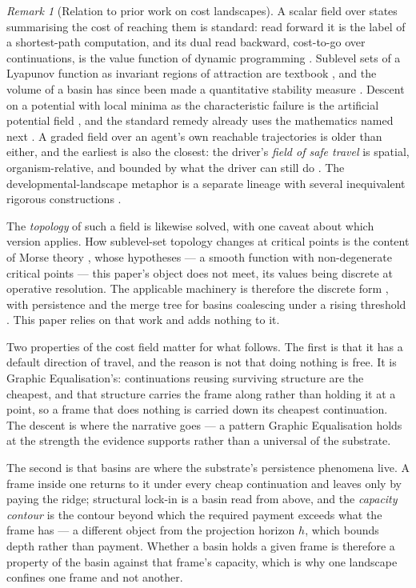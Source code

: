 \documentclass[11pt,a4paper]{article}
\theoremstyle{remark}
\newtheorem{remark}[definition]{Remark}
\begin{document}
\begin{remark}[Relation to prior work on cost landscapes]\label{rem:contours-prior}
A scalar field over states summarising the cost of reaching them is standard: read forward it is the
label of a shortest-path computation, and its dual read backward, cost-to-go over continuations, is
the value function of dynamic programming \citep{bellman1957}. Sublevel sets of a Lyapunov function
as invariant regions of attraction are textbook \citep{genesio1985}, and the volume of a basin has
since been made a quantitative stability measure \citep{menck2013}. Descent on a potential with local
minima as the characteristic failure is the artificial potential field \citep{khatib1986}, and the
standard remedy already uses the mathematics named next \citep{rimon1992}. A graded field over an
agent's own reachable trajectories is older than either, and the earliest is also the closest: the
driver's \emph{field of safe travel} is spatial, organism-relative, and bounded by what the driver
can still do \citep{gibsoncrooks1938}. The developmental-landscape metaphor is a separate lineage
with several inequivalent rigorous constructions \citep{zhou2016}.

The \emph{topology} of such a field is likewise solved, with one caveat about which version applies.
How sublevel-set topology changes at critical points is the content of Morse theory
\citep{milnor1963}, whose hypotheses --- a smooth function with non-degenerate critical points ---
this paper's object does not meet, its values being discrete at operative resolution. The applicable
machinery is therefore the discrete form \citep{forman1998}, with persistence and the merge tree for
basins coalescing under a rising threshold \citep{edelsbrunner2002,carr2010}. This paper relies on
that work and adds nothing to it.
\end{remark}

Two properties of the cost field matter for what follows. The first is that it has a default
direction of travel, and the reason is not that doing nothing is free. It is Graphic Equalisation's:
continuations reusing surviving structure are the cheapest, and that structure carries the frame
along rather than holding it at a point, so a frame that does nothing is carried down its cheapest
continuation. The descent is where the narrative goes --- a pattern Graphic Equalisation holds at
the strength the evidence supports rather than a universal of the substrate.

The second is that basins are where the substrate's persistence phenomena live. A frame inside one
returns to it under every cheap continuation and leaves only by paying the ridge; structural lock-in
is a basin read from above, and the \emph{capacity contour} is the contour beyond which the required
payment exceeds what the frame has --- a different object from the projection horizon $h$, which
bounds depth rather than payment. Whether a basin holds a given frame is therefore a property of the basin against
that frame's capacity, which is why one landscape confines one frame and not another.
\end{document}
